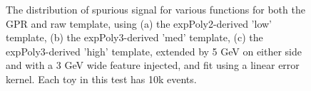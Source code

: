\begin{figure} 
\begin{center}

\caption{The distribution of spurious signal for various functions for both the GPR and raw template, using (a) the expPoly2-derived 'low' template, (b) the expPoly3-derived 'med' template, (c) the expPoly3-derived 'high' template, extended by 5 GeV on either side and with a 3 GeV wide feature injected, and fit using a linear error kernel. Each toy in this test has 10k events.}
\label{fig:linearkernel_lowpt_10k_Sig_1s}
\end{center}
\end{figure}

